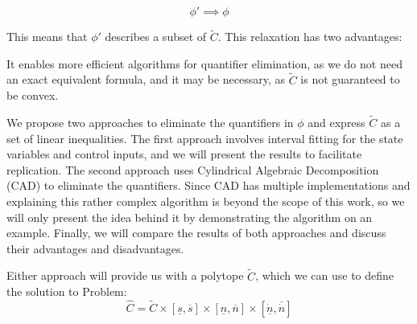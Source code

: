 \[ \phi'
	\implies \phi \]

This means that $\phi'$ describes a subset of $\tilde{C}$.
This relaxation has two advantages:

It enables more efficient algorithms for quantifier elimination, as we do not need an exact
equivalent formula, and it may be necessary, as $\tilde{C}$ is not guaranteed to be convex.

We propose two approaches to eliminate the quantifiers in $\phi$ and express $\tilde{C}$ as a set of linear inequalities.
The first approach involves interval fitting for the state variables and control inputs, and we will present the results to facilitate replication.
The second approach uses Cylindrical Algebraic Decomposition (CAD) to eliminate the quantifiers.
Since CAD has multiple implementations \cite{brown_qepcad_2003,chen_triangular_2013, Wolfram2023} and explaining this rather complex algorithm is
beyond the scope of this work, so we will only present the idea behind it by demonstrating the algorithm on an example.
Finally, we will compare the results of both approaches and discuss their advantages and disadvantages.

Either approach will provide us with a polytope $\tilde{C}$, which we can use to define the solution to Problem:
\begin{equation}
	\label{eq:pm_coupling_constraints}
	\hat{C} = \tilde{C} \times [\underline{s}, \overline{s}] \times [\underline{n}, \overline{n}] \times [\underline{\dot{n}}, \overline{\dot{n}}]
\end{equation}

